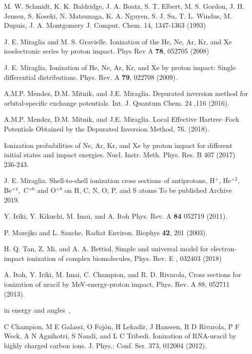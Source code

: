 \documentclass[preprint,12pt]{article}
\begin{document}
\begin{thebibliography}{99}

M. W. Schmidt, K. K. Baldridge, J. A. Boatz, S. T. Elbert, M. S. Gordon, 
J. H. Jensen, S. Koseki, N. Matsunaga, K. A. Nguyen, S. J. Su, T. L. Windus, 
M. Dupuis, J. A. Montgomery 
J. Comput. Chem. 14, 1347-1363 (1993)

J. E. Miraglia and M. S. Gravielle. Ionization of the
He, Ne, Ar, Kr, and Xe isoelectronic series by proton impact. 
Phys Rev A \textbf{78}, 052705 (2008)

J. E. Miraglia, Ionization of He, Ne, Ar, Kr, and Xe
by proton impact: Single differential distributions. 
Phys. Rev. A \textbf{79}, 022708 (2009).

A.M.P. Mendez, D.M. Mitnik, and J.E. Miraglia.
Depurated inversion method for orbital-specific exchange potentials. 
Int. J. Quantum Chem. 24 ,116 (2016).

A.M.P. Mendez, D.M. Mitnik, and J.E. Miraglia. Local Effective 
Hartree--Fock Potentials Obtained by the Depurated Inversion Method,
76. (2018).

Ionization probabilities of Ne, Ar, Kr, and Xe by
proton impact for different initial states and impact energies. 
Nucl. Instr. Meth. Phys. Res. B 407 (2017) 236-243.

J. E. Miraglia. Shell-to-shell ionization cross
sections of antiprotons, H$^{+}$, He$^{+2},$ Be$^{+4},$ C$^{+6}$ and 
O$^{+8}$ on H, C, N, O, P, and S atoms To be published Archive 2019.

Y. Iriki, Y. Kikuchi, M. Imai, and A. Itoh
Phys. Rev. A \textbf{84} 052719 (2011).

P. Mozejko and L. Sanche, Radiat Environ. 
Biophys \textbf{42}, 201 (2003).

H. Q. Tan, Z. Mi, and A. A. Bettiol, 
Simple and universal model for electron-impact ionization of complex biomolecules, 
Phys. Rev. E , 032403 (2018)

A. Itoh, Y. Iriki, M. Imai, C. Champion, and R. D. Rivarola, 
Cross sections for ionization of uracil by MeV-energy-proton impact, 
Phys. Rev. A 88, 052711 (2013).

\bibitem{} in energy and angles~,

C Champion, M E Galassi, O Foj\'{o}n, H Lekadir, J Hanssen, R D Rivarola,
P F Weck, A N Agnihotri, S Nandi, and L C Tribedi. Ionization of RNA-uracil
by highly charged carbon ions.
J. Phys.: Conf. Ser. 373, 012004 (2012).


\end{thebibliography}
\end{document}
